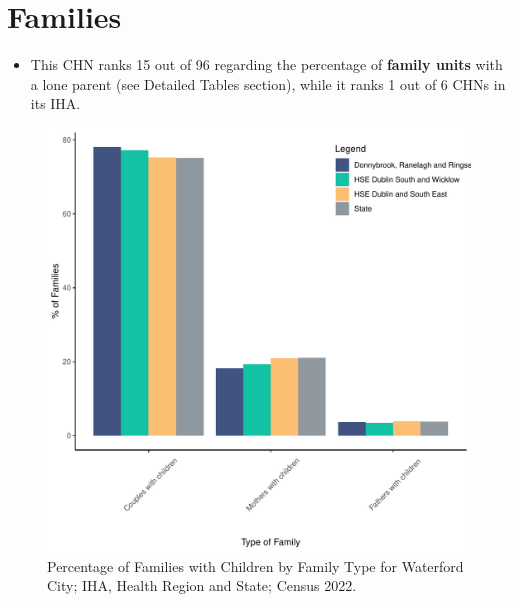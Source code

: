 \documentclass{article}
\begin{document}
\section{Families}\label{sect:Fam}
\begin{itemize}
\item This CHN ranks  15 out of 96 regarding the percentage of \textbf{family units} with a lone parent (see Detailed Tables section), while it ranks   1 out of 6 CHNs in its IHA.
\end{itemize}
\begin{figure}[H]
	\centering
	\includegraphics[width = 150mm]{../figures/FamED.pdf}
	\caption{Percentage of Families with Children by Family Type for Waterford City; IHA, Health Region and State; Census 2022.}
	\label{fig:vbnv}
	\end{figure}
	
\end{document}
